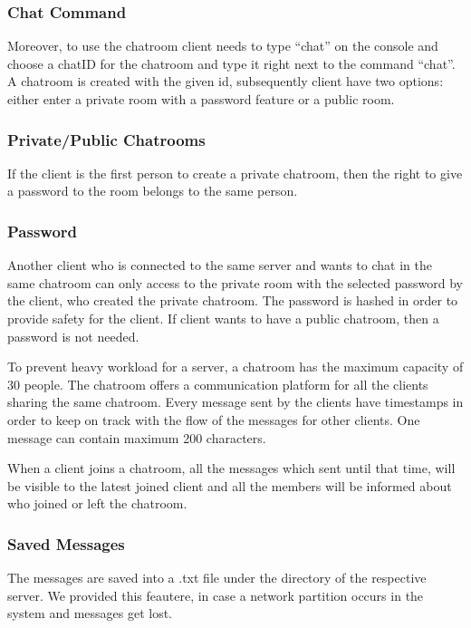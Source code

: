 \subsubsection{Chat Command}
\label{sec:groupchat_executionoftheworkflow_chatcommand}

Moreover, to use the chatroom client needs to type “chat” on the console and choose a chatID for the chatroom and type it right next to the command “chat”. A chatroom is created with the given id, subsequently client have two options: either enter a private room with a password feature or a public room. 
\subsubsection{Private/Public Chatrooms}
\label{sec:groupchat_executionoftheworkflow_chatrooms}

If the client is the first person to create a private chatroom, then the right to give a password to the room belongs to the same person.
\subsubsection{Password}
\label{sec:groupchat_executionoftheworkflow_chatrooms_password}

Another client who is connected to the same server and wants to chat in the same chatroom can only access to the private room with the selected password by the client, who created the private chatroom. The password is hashed in order to provide safety for the client. If client wants to have a public chatroom, then a password is not needed.

To prevent heavy workload for a server, a chatroom has the maximum capacity of 30 people. The chatroom offers a communication platform for all the clients sharing the same chatroom. Every message sent by the clients have timestamps in order to keep on track with the flow of the messages for other clients. One message can contain maximum 200 characters.

When a client joins a chatroom, all the messages which sent until that time, will be visible to the latest joined client and all the members will be informed about who joined or left the chatroom. 
\subsubsection{Saved Messages}
\label{sec:groupchat_executionoftheworkflow_savedmessages}

The messages are saved into a .txt file under the directory of the respective server. We provided this feautere, in case a network partition occurs in the system and messages get lost.

